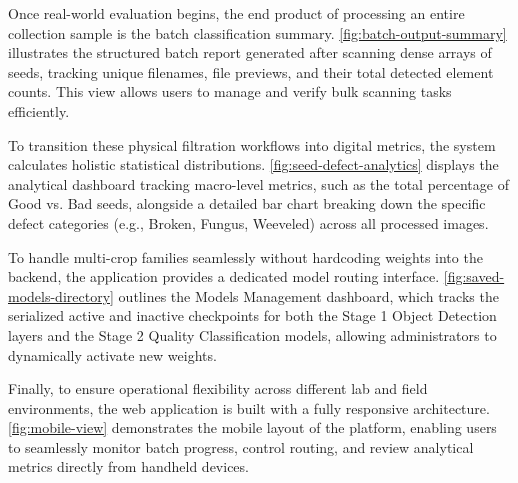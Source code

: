 
Once real-world evaluation begins, the end product of processing an entire collection sample is the batch classification summary. \autoref{fig:batch-output-summary} illustrates the structured batch report generated after scanning dense arrays of seeds, tracking unique filenames, file previews, and their total detected element counts. This view allows users to manage and verify bulk scanning tasks efficiently.


To transition these physical filtration workflows into digital metrics, the system calculates holistic statistical distributions. \autoref{fig:seed-defect-analytics} displays the analytical dashboard tracking macro-level metrics, such as the total percentage of Good vs. Bad seeds, alongside a detailed bar chart breaking down the specific defect categories (e.g., Broken, Fungus, Weeveled) across all processed images.


To handle multi-crop families seamlessly without hardcoding weights into the backend, the application provides a dedicated model routing interface. \autoref{fig:saved-models-directory} outlines the Models Management dashboard, which tracks the serialized active and inactive checkpoints for both the Stage 1 Object Detection layers and the Stage 2 Quality Classification models, allowing administrators to dynamically activate new weights.


Finally, to ensure operational flexibility across different lab and field environments, the web application is built with a fully responsive architecture. \autoref{fig:mobile-view} demonstrates the mobile layout of the platform, enabling users to seamlessly monitor batch progress, control routing, and review analytical metrics directly from handheld devices.

